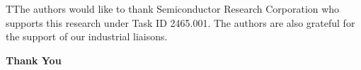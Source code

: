 TThe authors would like to thank Semiconductor Research Corporation who supports this research under Task ID 2465.001. The authors are also grateful for the support of our industrial liaisons. \\ 
\begin{center}
\textbf{Thank You}
\end{center}
